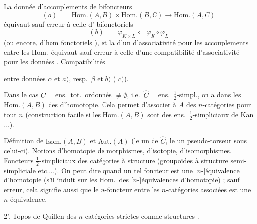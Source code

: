 \documentclass[11pt,a4paper]{article}
\begin{document}
La donnée d'accouplements de bifoncteurs
\[
(a) \qquad \mathrm{Hom}.(A,B) \times \mathrm{Hom}.(B,C) \longrightarrow
\mathrm{Hom}.(A,C)
\]
équivaut sauf erreur à celle d' bifonctoriels
\[
(b) \qquad \varphi_{K \times L} \Longleftarrow \varphi_{K} \circ \varphi_{L}
\]
(ou encore, d'hom fonctoriels
),
et la  d'un  d'associativité pour les
accouplements entre les Hom.\ équivaut sauf erreur à celle d'une
\struck{\ill}compatibilité d'associativité pour les données . Compatibilités

entre données $\alpha$ et $a)$, resp.\ $\beta$ et $b)$ (
$c)$).

Dans le cas $C$ = ens.\ tot.\ ordonnés $\neq \emptyset$, i.e.\ $\hat{C}$ =
ens.\ $\tfrac12$-simpl., on a dans les $\mathrm{Hom}.(A,B)$ des
 d'homotopie. Cela permet d'associer à $A$ des
$n$-catégories pour tout $n$ (construction facile si les $\mathrm{Hom}.(A,B)$
sont des ens.\ $\tfrac12$-simpliciaux de Kan ...).

 Définition de $\mathrm{Isom}.(A,B)$ et $\mathrm{Aut}.(A)$ (le
 un  de $\hat{C}$, le
 un pseudo-torseur sous celui-ci).
Notions d'homotopie de morphismes, d'isotopie, d'isomorphismes. Foncteurs
$\tfrac12$-simpliciaux des catégories à structure
 (groupoïdes à structure semi-simpliciale
etc....).  On peut dire
quand un tel foncteur est une [$n$-]équivalence d'homotopie (s'il induit sur
les Hom.\ des [$n$-]équivalences d'homotopie) ; sauf erreur, cela signifie
aussi que le $n$-foncteur entre les $n$-catégories associées est une
$n$-équivalence.   

2'. Topos de Quillen  des $n$-catégories
strictes comme structures .
\end{document}
